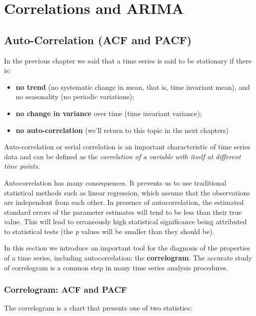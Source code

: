 \documentclass[
]{article}
\providecommand{\tightlist}{%
  \setlength{\itemsep}{0pt}\setlength{\parskip}{0pt}}
\begin{document}
\section{Correlations and ARIMA}\label{correlations-and-arima}

\subsection{Auto-Correlation (ACF and PACF)}\label{auto-correlation-acf-and-pacf}

In the previous chapter we said that a time series is said to be stationary if there is:

\begin{itemize}
\tightlist
\item
  \textbf{no trend} (no systematic change in mean, that is, time invariant mean), and no seasonality (no periodic variations);
\item
  \textbf{no change in variance} over time (time invariant variance);
\item
  \textbf{no auto-correlation} (we'll return to this topic in the next chapters)
\end{itemize}

Auto-correlation or serial correlation is an important characteristic of time series data and can be defined as the \emph{correlation of a variable with itself at different time points}.

Autocorrelation has many consequences. It prevents us to use traditional statistical methods such as linear regression, which assume that the observations are independent from each other. In presence of autocorrelation, the estimated standard errors of the parameter estimates will tend to be less than their true value. This will lead to erroneously high statistical significance being attributed to statistical tests (the \emph{p} values will be smaller than they should be).

In this section we introduce an important tool for the diagnosis of the properties of a time series, including autocorrelation: the \textbf{correlogram}. The accurate study of correlogram is a common step in many time series analysis procedures.

\subsubsection{Correlogram: ACF and PACF}\label{correlogram-acf-and-pacf}

The correlogram is a chart that presents one of two statistics:
\end{document}

